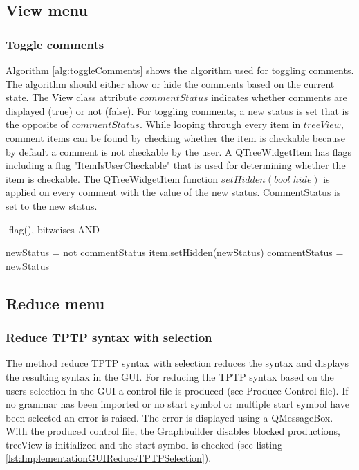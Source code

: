\subsection{View menu}\label{sec:ImplementationGUIViewMenu}
\subsubsection{Toggle comments}\label{sec:ImplementationGUIToggleComments}

Algorithm \ref{alg:toggleComments} shows the algorithm used for toggling comments. The algorithm should either show or hide the comments based on the current state. 
The View class attribute $commentStatus$ indicates whether comments are displayed (true) or not (false). For toggling comments, a new status is set that is the opposite of $commentStatus$. While looping through every item in $treeView$, comment items can be found by checking whether the item is checkable because by default a comment is not checkable by the user. A QTreeWidgetItem has flags including a flag "ItemIsUserCheckable" that is used for determining whether the item is checkable. The QTreeWidgetItem function $setHidden(bool\;hide)$ is applied on every comment with the value of the new status. CommentStatus is set to the new status. 

-flag(), bitweises AND 

\begin{algorithm}[H]
\caption{GUI Algorithm: toggle\textunderscore comments}
\label{alg:toggleComments}
\begin{algorithmic}[1] 
\State newStatus = not commentStatus
		\State item.setHidden(newStatus)
	\EndIf
\EndFor
\State commentStatus = newStatus
\end{algorithmic}
\end{algorithm}

\subsection{Reduce menu}\label{sec:ImplementationGUIReduceMenu}
\subsubsection{Reduce \ac{TPTP} syntax with selection}\label{sec:ImplementationGUIReduceWithSelection}

The method reduce \ac{TPTP} syntax with selection reduces the syntax and displays the resulting syntax in the GUI. 
For reducing the \ac{TPTP} syntax based on the users selection in the GUI a control file is produced (see Produce Control file). If no grammar has been imported or no start symbol or multiple start symbol have been selected an error is raised. The error is displayed using a QMessageBox. With the produced control file, the Graphbuilder disables blocked productions, treeView is initialized and the start symbol is checked (see listing \ref{lst:ImplementationGUIReduceTPTPSelection}). 

